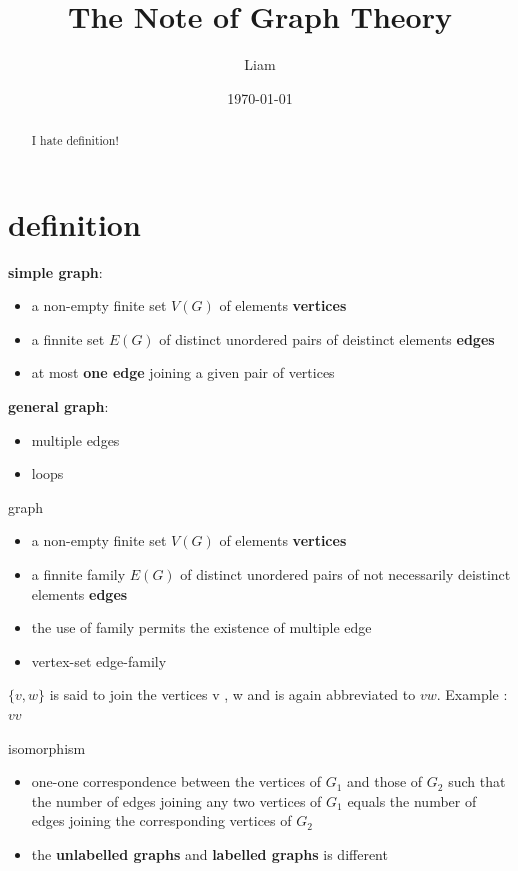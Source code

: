 \documentclass[12pt,a4paper]{ctexart}
\title{The Note of Graph Theory}
\author{Liam}
\date{\today}
\begin{document}
\maketitle

\begin{abstract}
I hate definition!
\end{abstract}

\section{definition}
\begin{center}
    \colorbox{mygrey}{\color{myred}\textbf{simple graph}:}
    \begin{itemize}
        \item a non-empty finite set $V(G)$ of elements \textbf{vertices}
        \item a finnite set $E(G)$ of distinct unordered pairs of deistinct elements \textbf{edges}
        \item at most \textbf{one edge} joining a given pair of vertices
    \end{itemize}
\end{center}
\begin{center}
    \colorbox{mygrey}{\color{myred}\textbf{general graph}:}
    \begin{itemize}
        \item multiple edges
        \item loops
    \end{itemize}
\end{center}
\begin{center}
    \colorbox{mygrey}{\color{myred}graph}
    \begin{itemize}
        \item a non-empty finite set $V(G)$ of elements \textbf{vertices}
        \item a finnite family $E(G)$ of distinct unordered pairs of not necessarily deistinct elements \textbf{edges}
        \item the use of \textcolor{myred}{family} permits the existence of multiple edge
        \item vertex-set  edge-family
    \end{itemize}
\end{center}
$\{v,w\}$ is said to join the vertices v , w and is again abbreviated to $vw$. Example : $vv$ 

\begin{center}
    \colorbox{mygrey}{\color{myred}isomorphism}
    \begin{itemize}
        \item one-one correspondence between the vertices of $G_1$ and those of $G_2$ such that the number of edges joining any two vertices of $G_1$ equals the number of edges joining the corresponding vertices of $G_2$
        \item the \textbf{unlabelled graphs} and \textbf{labelled graphs} is different
    \end{itemize}
\end{center}
\end{document}
